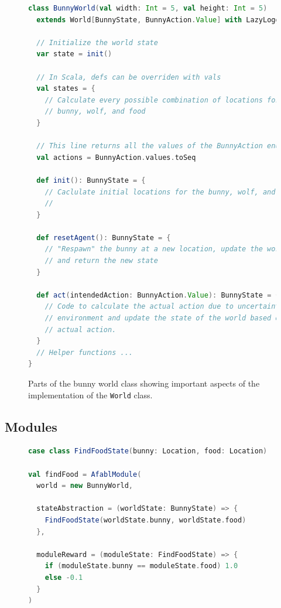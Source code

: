 \begin{figure}[ht]
\begin{center}

\begin{lstlisting}[language=Scala]
class BunnyWorld(val width: Int = 5, val height: Int = 5)
  extends World[BunnyState, BunnyAction.Value] with LazyLogging {

  // Initialize the world state
  var state = init()

  // In Scala, defs can be overriden with vals
  val states = {
    // Calculate every possible combination of locations for the
    // bunny, wolf, and food
  }

  // This line returns all the values of the BunnyAction enumeration
  val actions = BunnyAction.values.toSeq

  def init(): BunnyState = {
    // Caclulate initial locations for the bunny, wolf, and food.
    //
  }

  def resetAgent(): BunnyState = {
    // "Respawn" the bunny at a new location, update the world state
    // and return the new state
  }

  def act(intendedAction: BunnyAction.Value): BunnyState = {
    // Code to calculate the actual action due to uncertainty in the
    // environment and update the state of the world based on the
    // actual action.
  }
  // Helper functions ...
}
\end{lstlisting}

\caption{Parts of the bunny world class showing important aspects of the implementation of the {\tt World} class.}
\end{center}
\label{fig:bunny-world-code}
\end{figure}


\subsection{Modules}

\begin{figure}[ht]
\begin{center}

\begin{lstlisting}[language=Scala]
case class FindFoodState(bunny: Location, food: Location)

val findFood = AfablModule(
  world = new BunnyWorld,

  stateAbstraction = (worldState: BunnyState) => {
    FindFoodState(worldState.bunny, worldState.food)
  },

  moduleReward = (moduleState: FindFoodState) => {
    if (moduleState.bunny == moduleState.food) 1.0
    else -0.1
  }
)
\end{lstlisting}

\caption{}
\end{center}
\label{fig:find-food-code}
\end{figure}

